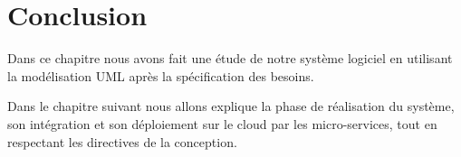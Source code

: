    \section{Conclusion}
   
   Dans ce chapitre nous avons fait une étude de notre système logiciel en utilisant la modélisation UML après la spécification des besoins. 
     
        Dans le chapitre suivant nous allons explique la phase de réalisation du système, son intégration et son déploiement sur le  cloud par les micro-services, tout en respectant les directives de la conception.
    
   